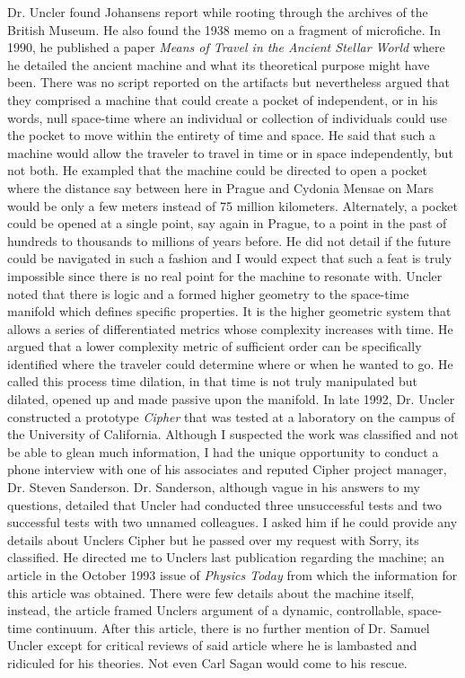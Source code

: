 Dr. Uncler found Johansen\textquotesingle s report while rooting through
the archives of the British Museum. He also found the 1938 memo on a
fragment of microfiche. In 1990, he published a paper \emph{Means of
Travel in the Ancient Stellar World} where he detailed the ancient
machine and what its theoretical purpose might have been. There was no
script reported on the artifacts but nevertheless argued that they
comprised a machine that could create a pocket of independent, or in his
words, null space-time where an individual or collection of individuals
could use the pocket to move within the entirety of time and space. He
said that such a machine would allow the traveler to travel in time or
in space independently, but not both. He exampled that the machine could
be directed to open a pocket where the distance say between here in
Prague and Cydonia Mensae on Mars would be only a few meters instead of
75 million kilometers. Alternately, a pocket could be opened at a single
point, say again in Prague, to a point in the past of hundreds to
thousands to millions of years before. He did not detail if the future
could be navigated in such a fashion and I would expect that such a feat
is truly impossible since there is no real point for the machine to
resonate with. Uncler noted that there is logic and a formed higher
geometry to the space-time manifold which defines specific properties.
It is the higher geometric system that allows a series of differentiated
metrics whose complexity increases with time. He argued that a lower
complexity metric of sufficient order can be specifically identified
where the traveler could determine where or when he wanted to go. He
called this process \textquotesingle time dilation\textquotesingle, in
that time is not truly manipulated but dilated, opened up and made
passive upon the manifold. In late 1992, Dr. Uncler constructed a
prototype \emph{Cipher} that was tested at a laboratory on the campus of
the University of California. Although I suspected the work was
classified and not be able to glean much information, I had the unique
opportunity to conduct a phone interview with one of his associates and
reputed Cipher project manager, Dr. Steven Sanderson. Dr. Sanderson,
although vague in his answers to my questions, detailed that Uncler had
conducted three unsuccessful tests and two successful tests with two
unnamed colleagues. I asked him if he could provide any details about
Uncler\textquotesingle s Cipher but he passed over my request with
\textquotesingle Sorry, it\textquotesingle s
classified.\textquotesingle{} He directed me to Uncler\textquotesingle s
last publication regarding the machine; an article in the October 1993
issue of \emph{Physics Today} from which the information for this
article was obtained. There were few details about the machine itself,
instead, the article framed Uncler\textquotesingle s argument of a
dynamic, controllable, space-time continuum. After this article, there
is no further mention of Dr. Samuel Uncler except for critical reviews
of said article where he is lambasted and ridiculed for his theories.
Not even Carl Sagan would come to his rescue.

